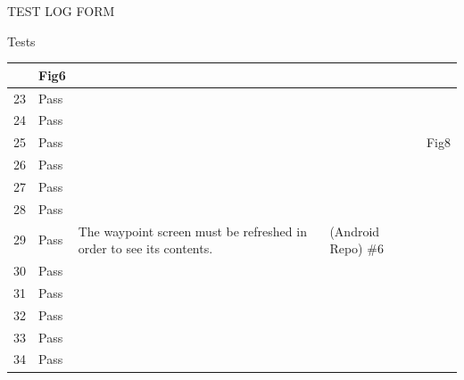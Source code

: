 \documentclass{article}
\begin{document}
\begin{section}{TEST LOG FORM}
\begin{subsection}{Tests}
\begin{tabularx}{\linewidth}{| p{1.5cm} | p{2cm} | p{7.5cm} | p{2cm} | X |}
&
Fig6
\\
\hline

23
&
Pass
&

&

&

\\
\hline

24
&
Pass
&

&

&

\\
\hline

25
&
Pass
&

&

&
Fig8
\\
\hline

26
&
Pass
&

&

&

\\
\hline

27
&
Pass
&

&

&

\\
\hline

28
&
Pass
&

&

&

\\
\hline

29
&
Pass
&
The waypoint screen must be refreshed in order to see its contents.
&
(Android Repo) \#6
&

\\
\hline

30
&
Pass
&

&

&

\\
\hline

31
&
Pass
&

&

&

\\
\hline

32
&
Pass
&

&

&

\\
\hline

33
&
Pass
&

&

&

\\
\hline

34
&
Pass
&


\end{tabularx}
\end{subsection}
\end{section}
\end{document}
